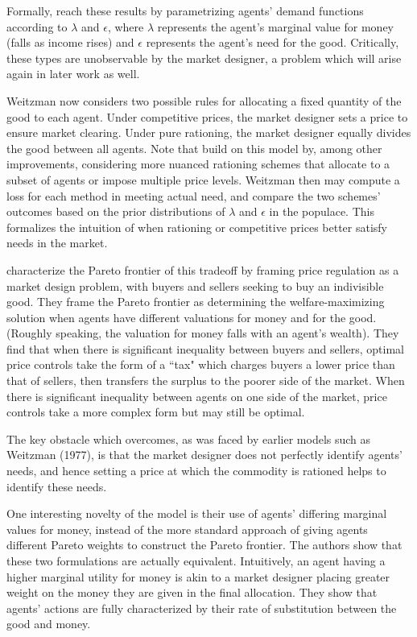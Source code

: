 \documentclass[JEL]{AEA}
\begin{document}
Formally, \cite{weitzman-1977} reach these results by parametrizing agents' demand functions according to $\lambda$ and $\epsilon$, where $\lambda$ represents the agent's marginal value for money (falls as income rises) and $\epsilon$ represents the agent's need for the good. Critically, these types are unobservable by the market designer, a problem which will arise again in later work as well.

Weitzman now considers two possible rules for allocating a fixed quantity of the good to each agent. Under competitive prices, the market designer sets a price to ensure market clearing. Under pure rationing, the market designer equally divides the good between all agents. Note that \cite{dworczak-2020} build on this model by, among other improvements, considering more nuanced rationing schemes that allocate to a subset of agents or impose multiple price levels. Weitzman then may compute a loss for each method in meeting actual need, and compare the two schemes' outcomes based on the prior distributions of $\lambda$ and $\epsilon$ in the populace. This formalizes the intuition of when rationing or competitive prices better satisfy needs in the market.

\cite{dworczak-2020} characterize the Pareto frontier of this tradeoff by framing price regulation as a market design problem, with buyers and sellers seeking to buy an indivisible good. They frame the Pareto frontier as determining the welfare-maximizing solution when agents have different valuations for money and for the good. (Roughly speaking, the valuation for money falls with an agent's wealth). They find that when there is significant inequality between buyers and sellers, optimal price controls take the form of a ``tax" which charges buyers a lower price than that of sellers, then transfers the surplus to the poorer side of the market. When there is significant inequality between agents on one side of the market, price controls take a more complex form but may still be optimal.

The key obstacle which \cite{dworczak-2020} overcomes, as was faced by earlier models such as Weitzman (1977), is that the market designer does not perfectly identify agents' needs, and hence setting a price at which the commodity is rationed helps to identify these needs.

One interesting novelty of the \cite{dworczak-2020} model is their use of agents' differing marginal values for money, instead of the more standard approach of giving agents different Pareto weights to construct the Pareto frontier. The authors show that these two formulations are actually equivalent. Intuitively, an agent having a higher marginal utility for money is akin to a market designer placing greater weight on the money they are given in the final allocation. They show that agents' actions are fully characterized by their rate of substitution between the good and money.
\end{document}
